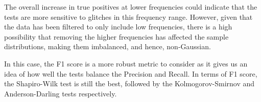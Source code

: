 \documentclass[12pt]{article}
\begin{document}
\medskip
\noindent The overall increase in true positives at lower frequencies could indicate that the tests are more sensitive to glitches in this frequency range. However, given that the data has been filtered to only include low frequencies, there is a high possibility that removing the higher frequencies has affected the sample distributions, making them imbalanced, and hence, non-Gaussian.

\medskip
\noindent In this case, the F1 score is a more robust metric to consider as it gives us an idea of how well the tests balance the Precision and Recall. In terms of F1 score, the Shapiro-Wilk test is still the best, followed by the Kolmogorov-Smirnov and Anderson-Darling tests respectively.

\end{document}
